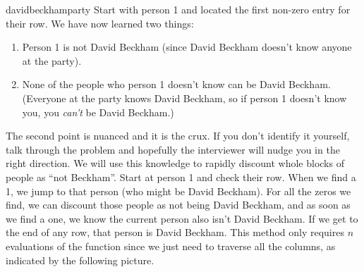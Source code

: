 \begin{answer}{davidbeckhamparty}
Start with person 1 and located the first non-zero entry for their row.
We have now learned two things:
\begin{enumerate}
  \item Person 1 is not David Beckham (since David Beckham doesn't know anyone at the party).
  \item None of the people who person 1 doesn't know can be David Beckham. (Everyone at the party knows David Beckham, so if person 1 doesn't know you, you \emph{can't} be David Beckham.)
\end{enumerate}
The second point is nuanced and it is the crux.
If you don't identify it yourself, talk through the problem and hopefully the interviewer will nudge you in the right direction.
We will use this knowledge to rapidly discount whole blocks of people as ``not Beckham''.
Start at person 1 and check their row.
When we find a 1, we jump to that person (who might be David Beckham).
For all the zeros we find, we can discount those people as not being David Beckham, and as soon as we find a one, we know the current person also isn't David Beckham.
If we get to the end of any row, that person is David Beckham.
This method only requires $n$ evaluations of the function since we just need to traverse all the columns, as indicated by the following picture.

\begin{center}
\end{center}
\end{answer}
